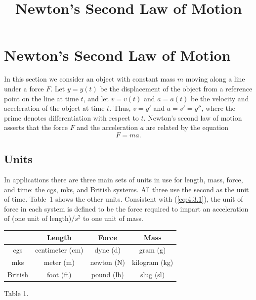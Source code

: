 \documentclass{ximera}
\title{Newton's Second Law of Motion}
\begin{document}
\begin{abstract}

\end{abstract}

\maketitle



\section*{Newton's Second Law of Motion}


In this section we consider an object with constant mass $m$ moving
along a line under a force $F$. Let $y=y(t)$ be the displacement of
the object from a reference point on the line at time $t$, and let
$v=v(t)$ and $a=a(t)$ be the velocity and acceleration of the object
at time $t$. Thus, $v=y'$ and $a=v'=y''$, where the prime denotes
differentiation with respect to $t$. Newton's second law of motion
asserts that the force $F$ and the acceleration $a$ are related by the
equation
\begin{equation} \label{eq:4.3.1}
F=ma.
\end{equation}

\subsection*{Units}

In applications there are three main sets of units in use for length,
mass, force, and time: the cgs, mks, and British systems. All three
use the second as the unit of time. Table~1 shows the other units.
 Consistent with (\ref{eq:4.3.1}), the unit of
force in each system is defined to be the force required to impart an
acceleration of (one unit of length)$/s^2$ to one unit of
mass.

\bigskip
\begin{center}
\begin{tabular}{|c|c|c|c|}
\hline
& {\bf Length}&{\bf Force}& {\bf Mass}\\\hline
  cgs & centimeter (cm) & dyne (d) & gram (g)\\\hline
 mks & meter (m) & newton (N) & kilogram (kg) \\\hline
British & foot (ft) & pound (lb) & slug (sl)\\\hline
\end{tabular}

Table 1.
\end{center}
\end{document}
